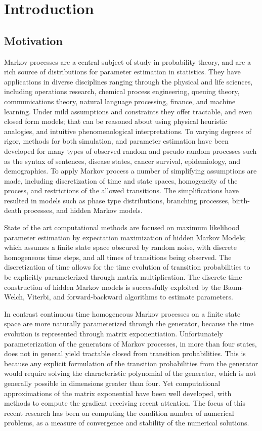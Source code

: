 \chapter{Introduction}
\section{Motivation}
Markov processes are a central subject of study in probability theory, and are a 
rich source of distributions for parameter estimation in statistics\cite{billingsley_probability_1995,rogers_diffusions_2000,rogers_diffusions_2000-1}.
They have applications in diverse disciplines ranging through the physical and 
life sciences, including operations research, chemical process engineering, 
queuing theory, communications theory, natural language processing, finance, and 
machine learning. Under mild assumptions and constraints they offer tractable,
and even closed form models; that can be reasoned about using physical heuristic 
analogies, and intuitive phenomenological interpretations. To varying degrees of 
rigor, methods for both simulation, and parameter estimation have been developed 
for many types of observed random and pseudo-random processes such as the syntax 
of sentences, disease states, cancer survival, epidemiology, and demographics. 
To apply Markov process a number of simplifying assumptions are made, including discretization of time and state spaces, 
homogeneity of the process, and restrictions of the allowed transitions. The simplifications have
resulted in models such as phase type distributions, branching processes, 
birth-death processes, and hidden Markov models.

State of the art computational methods are focused on maximum likelihood 
parameter estimation by expectation maximization of hidden Markov Models; which 
assumes a finite state space obscured by random noise, with discrete homogeneous 
time steps, and all times of transitions being observed. The discretization of 
time allows for the time evolution of transition probabilities to be explicitly 
parameterized through matrix multiplication. The discrete time construction of
hidden Markov models is successfully exploited by the Baum-Welch, Viterbi, and 
forward-backward algorithms to estimate parameters.

In contrast continuous time homogeneous Markov processes on a finite state space
are more naturally parameterized through the generator, because the time evolution is 
represented through matrix exponentiation. Unfortunately parameterization of the 
generators of Markov processes, in more than four states, does not in general 
yield tractable closed from transition probabilities. This is because any 
explicit formulation of the transition probabilities from the generator would 
require solving the characteristic polynomial of the generator, which is not 
generally possible in dimensions greater than four. Yet computational 
approximations of the matrix exponential have been well developed, with methods 
to compute the gradient receiving recent attention. The focus of this recent research has 
been on computing the condition number of numerical problems, as a measure of 
convergence and stability of the numerical solutions\cite{al-mohy_computing_2009}.

